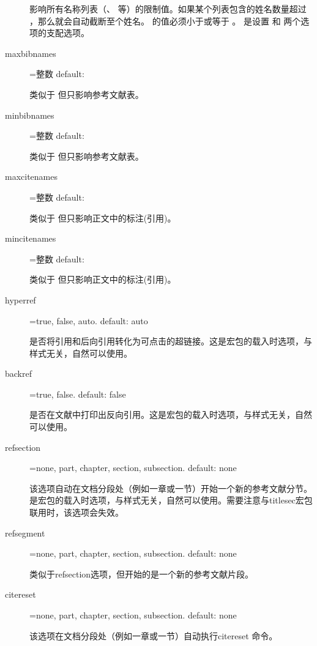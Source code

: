 \begin{description}
  影响所有名称列表（、 等）的限制值。如果某个列表包含的姓名数量超过 ，那么就会自动截断至个姓名。 的值必须小于或等于 。 是设置  和  两个选项的支配选项。

  \item[maxbibnames]=整数 \hfill default: 

  类似于  但只影响参考文献表。

  \item[minbibnames]=整数 \hfill default: 

  类似于   但只影响参考文献表。

  \item[maxcitenames]=整数 \hfill default: 

  类似于  但只影响正文中的标注(引用)。

  \item[mincitenames]=整数 \hfill default: 

  类似于  但只影响正文中的标注(引用)。

  \item[hyperref]=true, false, auto. \hfill default: auto

  是否将引用和后向引用转化为可点击的超链接。这是宏包的载入时选项，与样式无关，自然可以使用。

  \item[backref]=true, false. \hfill default: false

  是否在文献中打印出反向引用。这是宏包的载入时选项，与样式无关，自然可以使用。

  \item[refsection]=none, part, chapter, section, subsection. \hfill default: none

  该选项自动在文档分段处（例如一章或一节）开始一个新的参考文献分节。是宏包的载入时选项，与样式无关，自然可以使用。需要注意与titlesec宏包联用时，该选项会失效。

  \item[refsegment]=none, part, chapter, section, subsection. \hfill default: none

  类似于refsection选项，但开始的是一个新的参考文献片段。

  \item[citereset]=none, part, chapter, section, subsection. \hfill default: none

  该选项在文档分段处（例如一章或一节）自动执行citereset 命令。


\end{description}
